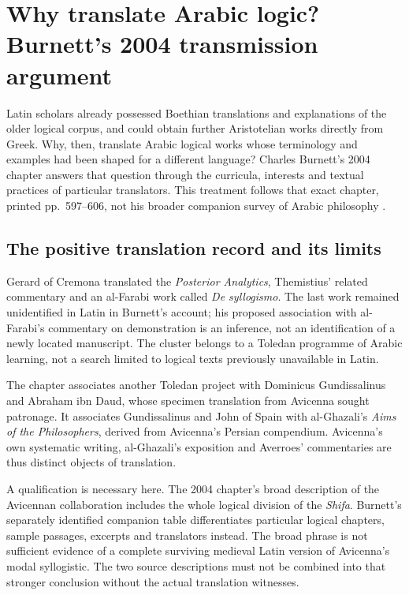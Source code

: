 \chapter{Why translate Arabic logic? Burnett's 2004 transmission argument}
\label{sec:p13-burnett-arabic-latin-2004}

Latin scholars already possessed Boethian translations and explanations
of the older logical corpus, and could obtain further Aristotelian works
directly from Greek. Why, then, translate Arabic logical works whose
terminology and examples had been shaped for a different language?
Charles Burnett's 2004 chapter answers that question through the
curricula, interests and textual practices of particular translators.
This treatment follows that exact chapter, printed pp.~597--606,
not his broader companion survey of Arabic philosophy
\cite{Burnett2004ArabicLatinHHL}.

\section{The positive translation record and its limits}
\label{sec:p13-burnett-2004-translators}

Gerard of Cremona translated the \emph{Posterior Analytics},
Themistius' related commentary and an al-Farabi work called
\emph{De syllogismo}. The last work remained unidentified in
Latin in Burnett's account; his proposed association with
al-Farabi's commentary on demonstration is an inference, not
an identification of a newly located manuscript. The cluster
belongs to a Toledan programme of Arabic learning, not a
search limited to logical texts previously unavailable in Latin.
\cite[pp.~597--598, 604--605]{Burnett2004ArabicLatinHHL}

The chapter associates another Toledan project with Dominicus
Gundissalinus and Abraham ibn Daud, whose specimen translation
from Avicenna sought patronage. It associates Gundissalinus
and John of Spain with al-Ghazali's \emph{Aims of the Philosophers},
derived from Avicenna's Persian compendium. Avicenna's own
systematic writing, al-Ghazali's exposition and Averroes'
commentaries are thus distinct objects of translation.
\cite[p.~598]{Burnett2004ArabicLatinHHL}

A qualification is necessary here. The 2004 chapter's broad
description of the Avicennan collaboration includes the whole
logical division of the \emph{Shifa}. Burnett's separately
identified companion table differentiates particular logical
chapters, sample passages, excerpts and translators instead.
The broad phrase is not sufficient evidence of a complete
surviving medieval Latin version of Avicenna's modal syllogistic.
The two source descriptions must not be combined into that
stronger conclusion without the actual translation witnesses.
\cite[p.~598]{Burnett2004ArabicLatinHHL}
\cite[pp.~394--395]{Burnett2005ArabicLatinSupplement}

